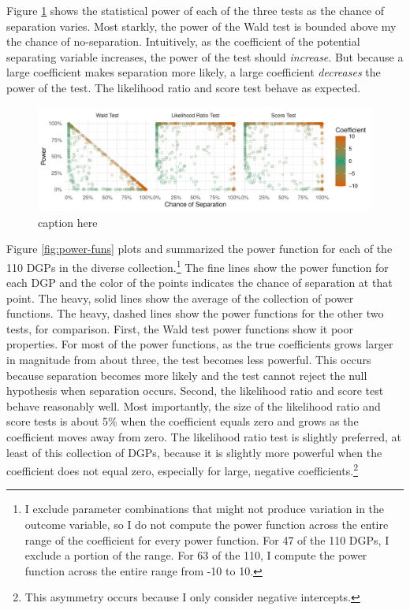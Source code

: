 \documentclass[
]{article}
\begin{document}
Figure \ref{fig:many-sims} shows the statistical power of each of the
three tests as the chance of separation varies. Most starkly, the power
of the Wald test is bounded above my the chance of no-separation.
Intuitively, as the coefficient of the potential separating variable
increases, the power of the test should \emph{increase}. But because a
large coefficient makes separation more likely, a large coefficient
\emph{decreases} the power of the test. The likelihood ratio and score
test behave as expected.

\begin{figure}[h]
\includegraphics[width=\textwidth]{doc/fig/many-sims.pdf}
\caption{caption here}\label{fig:many-sims}
\end{figure}

Figure \ref{fig:power-funs} plots and summarized the power function for
each of the 110 DGPs in the diverse collection.\footnote{I exclude
  parameter combinations that might not produce variation in the outcome
  variable, so I do not compute the power function across the entire
  range of the coefficient for every power function. For 47 of the 110
  DGPs, I exclude a portion of the range. For 63 of the 110, I compute
  the power function across the entire range from -10 to 10.} The fine
lines show the power function for each DGP and the color of the points
indicates the chance of separation at that point. The heavy, solid lines
show the average of the collection of power functions. The heavy, dashed
lines show the power functions for the other two tests, for comparison.
First, the Wald test power functions show it poor properties. For most
of the power functions, as the true coefficients grows larger in
magnitude from about three, the test becomes less powerful. This occurs
because separation becomes more likely and the test cannot reject the
null hypothesis when separation occurs. Second, the likelihood ratio and
score test behave reasonably well. Most importantly, the size of the
likelihood ratio and score tests is about 5\% when the coefficient
equals zero and grows as the coefficient moves away from zero. The
likelihood ratio test is slightly preferred, at least of this collection
of DGPs, because it is slightly more powerful when the coefficient does
not equal zero, especially for large, negative coefficients.\footnote{This
  asymmetry occurs because I only consider negative intercepts.}
\end{document}
